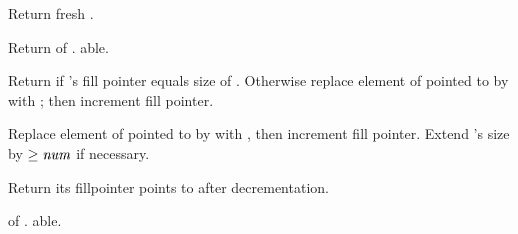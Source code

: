 \begin{LIST}{1cm}
  
  {
  Return fresh .
  }

  {
  Return  of . able.
  }

  {
  Return \retval{\NIL} if 's fill pointer equals size of
  . Otherwise replace element of  pointed to
  by  with ; then increment fill
  pointer. 
  }

  {
  Replace element of  pointed to by  with
  , then increment fill pointer. Extend 's size by
  $\ge \VAR{num}$ if necessary.
  }

  {
  Return  its fillpointer points to
  after decrementation.
  }

  {
   of . able.
  }

\end{LIST}



